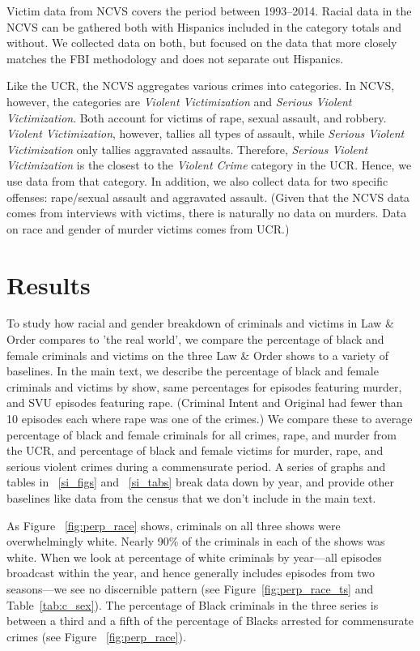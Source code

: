 \documentclass[12pt, letterpaper]{article}
\begin{document}
Victim data from NCVS covers the period between 1993--2014. Racial data in the NCVS can be gathered both with Hispanics included in the category totals and without. We collected data on both, but focused on the data that more closely matches the FBI methodology and does not separate out Hispanics.

Like the UCR, the NCVS aggregates various crimes into categories. In NCVS, however, the categories are \textit{Violent Victimization} and \textit{Serious Violent Victimization}. Both account for victims of rape, sexual assault, and robbery. \textit{Violent Victimization}, however, tallies all types of assault, while \textit{Serious Violent Victimization} only tallies aggravated assaults. Therefore, \textit{Serious Violent Victimization} is the closest to the \textit{Violent Crime} category in the UCR. Hence, we use data from that category. In addition, we also collect data for two specific offenses: rape/sexual assault and aggravated assault. (Given that the NCVS data comes from interviews with victims, there is naturally no data on murders. Data on race and gender of murder victims comes from UCR.)

\section*{Results}
To study how racial and gender breakdown of criminals and victims in Law \& Order compares to 'the real world', we compare the percentage of black and female criminals and victims on the three Law \& Order shows to a variety of baselines. In the main text, we describe the percentage of black and female criminals and victims by show, same percentages for episodes featuring murder, and SVU episodes featuring rape. (Criminal Intent and Original had fewer than 10 episodes each where rape was one of the crimes.) We compare these to average percentage of black and female criminals for all crimes, rape, and murder from the UCR, and percentage of black and female victims for murder, rape, and serious violent crimes during a commensurate period. A series of graphs and tables in ~\ref{si_figs} and ~\ref{si_tabs} break data down by year, and provide other baselines like data from the census that we don't include in the main text.

As Figure ~\ref{fig:perp_race} shows, criminals on all three shows were overwhelmingly white. Nearly 90\% of the criminals in each of the shows was white. When we look at percentage of white criminals by year---all episodes broadcast within the year, and hence generally includes episodes from two seasons---we see no discernible pattern (see Figure~\ref{fig:perp_race_ts} and Table~\ref{tab:c_sex}). The percentage of Black criminals in the three series is between a third and a fifth of the percentage of Blacks arrested for commensurate crimes (see Figure ~\ref{fig:perp_race}). 
\end{document}
